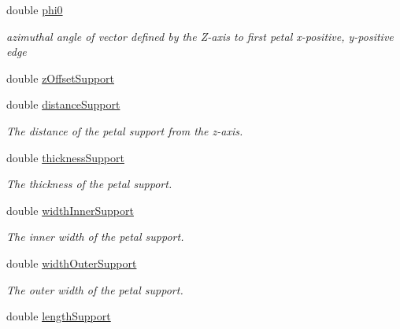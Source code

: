 \begin{DoxyCompactItemize}
double \hyperlink{struct_d_d4hep_1_1_d_d_rec_1_1_z_disk_petals_struct_1_1_layer_layout_a9f475e0e0241b8d7198b0c0a3511dd2f}{phi0}
\begin{DoxyCompactList}\small\item\em azimuthal angle of vector defined by the Z-\/axis to first petal x-\/positive, y-\/positive edge \item\end{DoxyCompactList}\item 
double \hyperlink{struct_d_d4hep_1_1_d_d_rec_1_1_z_disk_petals_struct_1_1_layer_layout_acce2801e94b24764955762c2a659e96b}{zOffsetSupport}
\item 
double \hyperlink{struct_d_d4hep_1_1_d_d_rec_1_1_z_disk_petals_struct_1_1_layer_layout_a2c3400e7a403bd903dfe542baaae4ead}{distanceSupport}
\begin{DoxyCompactList}\small\item\em The distance of the petal support from the z-\/axis. \item\end{DoxyCompactList}\item 
double \hyperlink{struct_d_d4hep_1_1_d_d_rec_1_1_z_disk_petals_struct_1_1_layer_layout_a49467ec112b66d8cf7be0276d2c0db9d}{thicknessSupport}
\begin{DoxyCompactList}\small\item\em The thickness of the petal support. \item\end{DoxyCompactList}\item 
double \hyperlink{struct_d_d4hep_1_1_d_d_rec_1_1_z_disk_petals_struct_1_1_layer_layout_ad2a842725740bd0d2e2bc412f9e54f02}{widthInnerSupport}
\begin{DoxyCompactList}\small\item\em The inner width of the petal support. \item\end{DoxyCompactList}\item 
double \hyperlink{struct_d_d4hep_1_1_d_d_rec_1_1_z_disk_petals_struct_1_1_layer_layout_ad5542ca1bb7f8141957104d4415fbb61}{widthOuterSupport}
\begin{DoxyCompactList}\small\item\em The outer width of the petal support. \item\end{DoxyCompactList}\item 
double \hyperlink{struct_d_d4hep_1_1_d_d_rec_1_1_z_disk_petals_struct_1_1_layer_layout_a67fb8540056b8f6523fefa061c7b5aa8}{lengthSupport}

\end{DoxyCompactItemize}
